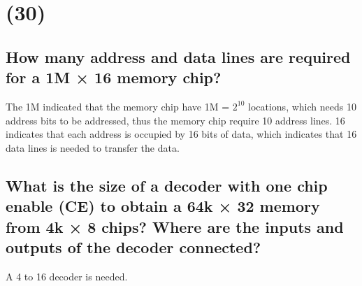 \documentclass{article}
\begin{document}
\section{(30)}
\subsection{How many address and data lines are required for a 1M × 16 memory chip?}
The 1M indicated that the memory chip have 1M = $2^{10}$ locations, which needs 10 address bits to be addressed, thus the memory chip require 10 address lines. 16 indicates that each address is occupied by 16 bits of data, which indicates that 16 data lines is needed to transfer the data.
\newpage
\subsection{What is the size of a decoder with one chip enable (CE) to obtain a 64k × 32 memory from 4k × 8 chips? Where are the inputs and outputs of the decoder connected?}
A 4 to 16 decoder is needed. 
\end{document}
